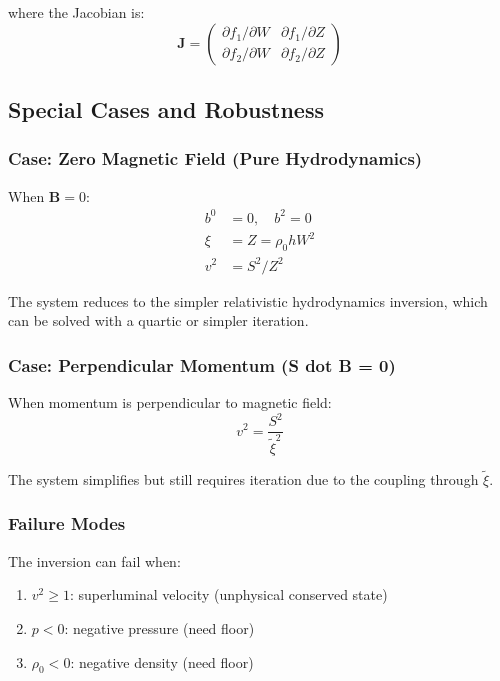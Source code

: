 \documentclass[12pt,a4paper]{article}
\begin{document}
where the Jacobian is:
\begin{equation}
\bm{J} = \begin{pmatrix}
\partial f_1/\partial W & \partial f_1/\partial Z \\
\partial f_2/\partial W & \partial f_2/\partial Z
\end{pmatrix}
\label{eq:jacobian}
\end{equation}

\subsection{Special Cases and Robustness}

\subsubsection{Case: Zero Magnetic Field (Pure Hydrodynamics)}

When $\bm{B} = 0$:
\begin{align}
b^0 &= 0, \quad b^2 = 0 \\
\xi &= Z = \rho_0 h W^2 \\
v^2 &= S^2/Z^2
\end{align}

The system reduces to the simpler relativistic hydrodynamics inversion, which
can be solved with a quartic or simpler iteration.

\subsubsection{Case: Perpendicular Momentum (S dot B = 0)}

When momentum is perpendicular to magnetic field:
\begin{equation}
v^2 = \frac{S^2}{\tilde{\xi}^2}
\end{equation}

The system simplifies but still requires iteration due to the coupling through $\tilde{\xi}$.

\subsubsection{Failure Modes}

The inversion can fail when:
\begin{enumerate}
    \item $v^2 \geq 1$: superluminal velocity (unphysical conserved state)
    \item $p < 0$: negative pressure (need floor)
    \item $\rho_0 < 0$: negative density (need floor)
\end{enumerate}
\end{document}
